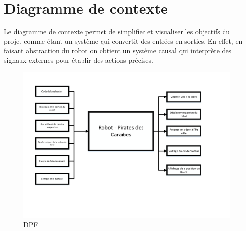 \chapter{Diagramme de contexte}

Le diagramme de contexte permet de simplifier et visualiser les objectifs du projet comme étant un système qui convertit des entrées en sorties. En effet, en faisant abstraction du robot on obtient un système causal qui interprète des signaux externes pour établir des actions précises.

\begin{figure}[h]
  \centering
  \includegraphics[scale=0.6, trim = 5mm 15mm 10mm 5mm, clip]{resources/diag_cont.pdf}
  \caption{DPF}
\end{figure}
